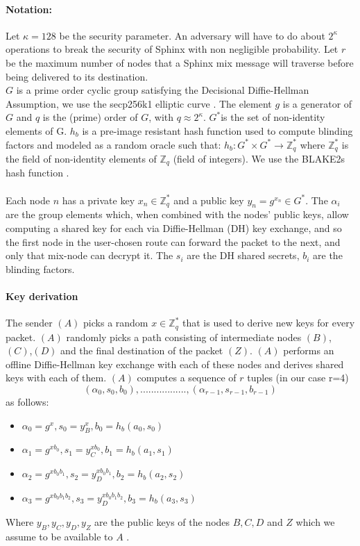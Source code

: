 \paragraph{Notation:}Let $\kappa=128$ be the security parameter. An adversary will have to do about $2^\kappa$ operations to break the security of Sphinx with non negligible probability.
Let $r$ be the maximum number of nodes that a Sphinx mix message will traverse before being delivered to its destination.
\\$G$ is a prime order cyclic group satisfying the Decisional Diffie-Hellman Assumption, we use the secp256k1 elliptic curve \cite{sec2}. The element $g$ is a generator of $G$ and $q$ is the (prime) order of $G$, with $q\approx2^{\kappa}$.
$G^*$is the set of non-identity elements of G. $h_b$ is a pre-image resistant hash function used to compute blinding factors and modeled as a random oracle such that:
$h_b:G^*\times G^*\rightarrow\mathbb{Z}^*_q$ where $\mathbb{Z}^*_q$ is the field of non-identity elements of $\mathbb{Z}_q$ (field of integers). We use the BLAKE2s hash function \cite{blake2}.
    \\~\\Each node $n$ has a private key $x_n\in \mathbb{Z}^*_q$ and a public key $y_n=g^{x_n}\in G^*$.
    The $\alpha_i$ are the group elements which, when combined with the nodes’ public keys, allow computing a shared key for each via Diffie-Hellman (DH) key exchange, and so the first node in the user-chosen route can forward the packet to the next, and only that mix-node can decrypt it.
    The $s_i$ are the DH shared secrets, $b_i$ are the blinding factors.

    \paragraph{Key derivation}
    The sender $(A)$ picks a random $x\in \mathbb{Z}^*_q$ that is used to derive new keys for every packet.
    \newline $(A)$ randomly picks a path consisting of intermediate nodes $(B)$, $(C)$,$(D)$ and the final destination of the packet $(Z)$.
    \newline $(A)$ performs an offline Diffie-Hellman key exchange with each of these nodes and derives shared keys with each of them.
    \newline $(A)$ computes a sequence of $r$ tuples (in our case r=4)  $$(\alpha_0,s_0,b_0),.................,(\alpha_{r-1},s_{r-1},b_{r-1})$$ as follows:
    \begin{itemize}
        \item $\alpha_0=g^x,s_0=y^x_B,b_0=h_b(a_0,s_0)$
        \item $\alpha_1=g^{xb_0},s_1=y^{xb_0}_C,b_1=h_b(a_1,s_1)$
        \item $\alpha_2=g^{xb_0b_1},s_2=y^{xb_0b_1}_D,b_2=h_b(a_2,s_2)$
        \item $\alpha_3=g^{xb_0b_1b_2},s_3=y^{xb_0b_1b_2}_D,b_3=h_b(a_3,s_3)$
    \end{itemize}
    Where $y_B,y_C,y_D,y_Z$ are the public keys of the nodes $B,C, D$ and $Z$  which we assume to be available to $A$ .
